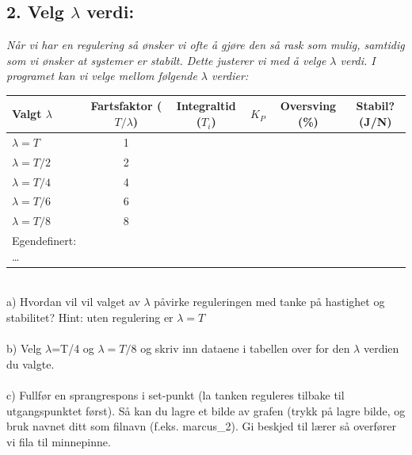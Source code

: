 \documentclass[a4paper,11pt]{article}
\begin{document}
\subsection*{2. Velg $\lambda$ verdi: }
\textit{Når vi har en regulering så ønsker vi ofte å gjøre den så rask som mulig, samtidig som vi ønsker at systemer er stabilt. Dette justerer vi med å velge $\lambda$ verdi.  I programet kan vi velge mellom følgende $\lambda$ verdier:  }\\
\begin{table}[htbp]
\centering
\renewcommand{\arraystretch}{1.3} 
\begin{tabular}{|l|c|c|>{\centering\arraybackslash}p{2.5cm}|c|c|} %
\hline
Valgt $\lambda$ & Fartsfaktor ($T/\lambda$) & Integraltid ($T_i$) & $K_P$ & Oversving (\%) & Stabil? (J/N) \\ \hline
$\lambda = T$        & 1                         &                     &       &                &               \\ \hline
$\lambda = T/2$      & 2                         &                     &       &                &               \\ \hline
$\lambda = T/4$      & 4                         &                     &       &                &               \\ \hline
$\lambda = T/6$      & 6                         &                     &       &                &               \\ \hline
$\lambda = T/8$      & 8                         &                     &       &                &               \\ \hline
Egendefinert: \dots  &                           &                     &       &                &               \\ \hline
\end{tabular}
\end{table} \\
a) Hvordan vil vil valget av $\lambda$ påvirke reguleringen med tanke på hastighet og stabilitet? Hint: uten regulering er $\lambda=T$\\\\
b) Velg $\lambda$=T/4 og $\lambda=T/8$ og skriv inn dataene i tabellen over for den $\lambda$ verdien du valgte.\\\\
c) Fullfør en sprangrespons i set-punkt (la tanken reguleres tilbake til utgangspunktet først).  Så kan du lagre et bilde av grafen (trykk på lagre bilde, og bruk navnet ditt som filnavn (f.eks. marcus\_2).  Gi beskjed til lærer så overfører vi fila til minnepinne.
\end{document}
